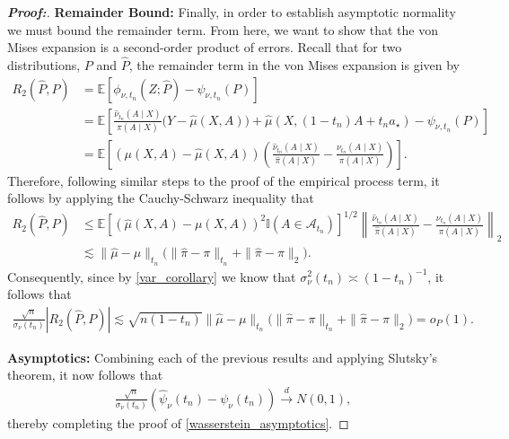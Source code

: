 \documentclass[11pt,twoside]{article}
\theoremstyle{definition}
\theoremstyle{remark}
\begin{document}
\begin{proof}[\textbf{Proof:}]
\textbf{Remainder Bound:} Finally, in order to establish asymptotic normality we must bound the remainder term. From here, we want to show that the von Mises expansion is a second-order product of errors. Recall that for two distributions, $P$ and $\widehat{P}$, the remainder term in the von Mises expansion is given by
\begin{align*}
    R_2(\widehat{P}, P) &= \mathbb{E}\left[\phi_{\nu, t_n}(Z; \widehat{P}) - \psi_{\nu, t_n}(P)\right] \\[0.05in]
    &= \mathbb{E}\left[ \frac{\widehat{\nu}_{t_n}(A \mid X)}{\widehat{\pi}(A \mid X)}\Big(Y - \widehat{\mu}(X, A) \Big) + \widehat{\mu}(X, (1 - t_n)A + t_n a_{\star}) -  \psi_{\nu, t_n}(P)\right] \\
    &= \mathbb{E}\left[ \left(\mu(X, A) - \widehat{\mu}(X, A) \right)\left(  \frac{\widehat{\nu}_{t_n}(A \mid X)}{\widehat{\pi}(A \mid X)} - \frac{\nu_{t_n}(A \mid X)}{\pi(A \mid X)} \right)  \right].
\end{align*}
Therefore, following similar steps to the proof of the empirical process term, it follows by applying the Cauchy-Schwarz inequality that
\begin{align*}
    R_2(\widehat{P}, P) &\leq \mathbb{E}\left[\left(\widehat{\mu}(X, A) - \mu(X, A) \right)^2 \mathbb{I}(A\in\mathcal{A}_{t_n}) \right]^{1/2}
    \left\| \frac{\widehat{\nu}_{t_n}(A \mid X)}{\widehat{\pi}(A \mid X)} - \frac{\nu_{t_n}(A \mid X)}{\pi(A \mid X)} \right\|_2 \\
    &\lesssim \| \widehat{\mu} - \mu \|_{t_n} \Big( \|\widehat{\pi} - \pi\|_{t_n} + \|\widehat{\pi} - \pi\|_2 \Big).
\end{align*}
Consequently, since by \cref{var_corollary} we know that $\sigma^2_{\nu}(t_n) \asymp (1 - t_n)^{-1}$, it follows that
\begin{align*}
     \frac{\sqrt{n}}{\sigma_{\nu}(t_n)} |R_{2}(\widehat{P},P)| \lesssim \sqrt{n(1 - t_n)} \| \widehat{\mu} - \mu \|_{t_n} \Big( \|\widehat{\pi} - \pi\|_{t_n} + \|\widehat{\pi} - \pi\|_2 \Big) = o_P(1).
\end{align*}



\textbf{Asymptotics:} Combining each of the previous results and applying Slutsky's theorem, it now follows that
\begin{align*}
     \frac{\sqrt{n}}{\sigma_\nu(t_n)}\left(\widehat{\psi}_\nu(t_n) - \psi_\nu(t_n) \right)\overset{d}{\longrightarrow}N(0,1),
\end{align*}
thereby completing the proof of \cref{wasserstein_asymptotics}.
\end{proof}
\end{document}
